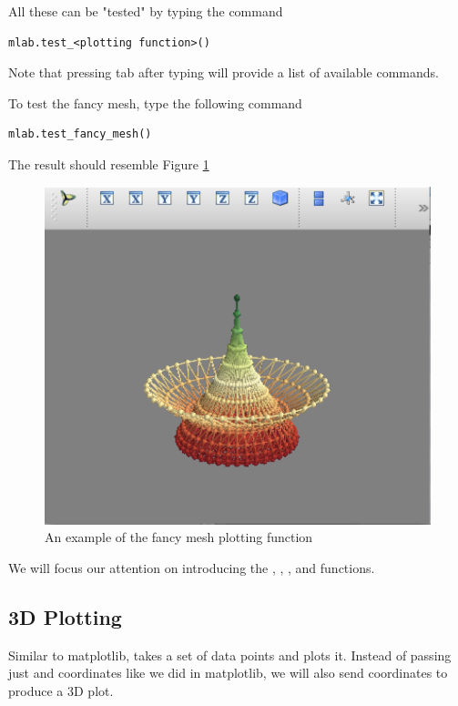 All these can be "tested" by typing the command
\begin{lstlisting}
mlab.test_<plotting function>()
\end{lstlisting}
Note that pressing tab after typing  will provide a 
list of available commands. 

To test the fancy mesh, type the following command
\begin{lstlisting}
mlab.test_fancy_mesh()
\end{lstlisting}

The result should resemble Figure \ref{mayavi:fancymesh}

\begin{figure} 
\includegraphics[width=\textwidth]{fancymesh.pdf}
\caption{An example of the fancy mesh plotting function} 
\label{mayavi:fancymesh}
\end{figure}


We will focus our attention on introducing the , , 
, and  functions. 


\subsection*{3D Plotting} Similar to matplotlib,  takes a set
of data points and plots it. Instead of passing just  and 
coordinates like we did in matplotlib, we will also send 
coordinates to produce a 3D plot. 

